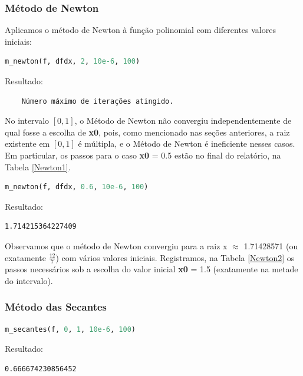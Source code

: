 \documentclass{article}
\begin{document}
\subsubsection{Método de Newton}
Aplicamos o método de Newton à função polinomial com diferentes valores iniciais:

\begin{lstlisting}[language=Python]
m_newton(f, dfdx, 2, 10e-6, 100)
\end{lstlisting}

Resultado:
\begin{verbatim}
    Número máximo de iterações atingido.
\end{verbatim}

No intervalo $[0,1]$, o Método de Newton não convergiu independentemente de qual fosse a escolha de \textbf{x0}, pois, como mencionado nas seções anteriores, a raiz existente em $[0,1]$ é múltipla, e o Método de Newton é ineficiente nesses casos. Em particular, os passos para o caso \textbf{x0} = 0.5 estão no final do relatório, na Tabela  \eqref{Newton1}.\\

\begin{lstlisting}[language=Python]
m_newton(f, dfdx, 0.6, 10e-6, 100)
\end{lstlisting}

Resultado:
\begin{verbatim}
1.714215364227409
\end{verbatim}

Observamos que o método de Newton convergiu para a raiz x $\approx$ 1.71428571 (ou exatamente $\frac{12}{7}$) com vários valores iniciais. Registramos, na Tabela \ref{Newton2} os passos necessários sob a escolha do valor inicial \textbf{x0} = 1.5 (exatamente na metade do intervalo).

\subsubsection{Método das Secantes}

\begin{lstlisting}[language=Python]
m_secantes(f, 0, 1, 10e-6, 100)
\end{lstlisting}

Resultado:
\begin{verbatim}
0.666674230856452
\end{verbatim}
\end{document}
